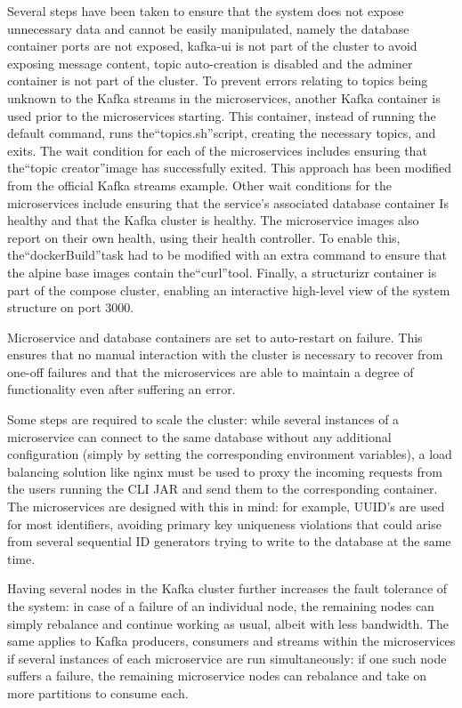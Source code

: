 \documentclass[parskip=full]{article}
\begin{document}
Several steps have been taken to ensure that the system does not expose unnecessary data and cannot be easily manipulated, namely the database container ports are not exposed, kafka-ui is not part of the cluster to avoid exposing message content, topic auto-creation is disabled and the adminer container is not part of the cluster.
To prevent errors relating to topics being unknown to the Kafka streams in the microservices, another Kafka container is used prior to the microservices starting.
This container, instead of running the default command, runs the``topics.sh''script, creating the necessary topics, and exits.
The wait condition for each of the microservices includes ensuring that the``topic creator''image has successfully exited.
This approach has been modified from the official Kafka streams example.
Other wait conditions for the microservices include ensuring that the service's associated database container Is healthy and that the Kafka cluster is healthy.
The microservice images also report on their own health, using their health controller.
To enable this, the``dockerBuild''task had to be modified with an extra command to ensure that the alpine base images contain the``curl''tool.
Finally, a structurizr container is part of the compose cluster, enabling an interactive high-level view of the system structure on port 3000.

Microservice and database containers are set to auto-restart on failure.
This ensures that no manual interaction with the cluster is necessary to recover from one-off failures and that the microservices are able to maintain a degree of functionality even after suffering an error.

Some steps are required to scale the cluster: while several instances of a microservice can connect to the same database without any additional configuration (simply by setting the corresponding environment variables), a load balancing solution like nginx must be used to proxy the incoming requests from the users running the CLI JAR and send them to the corresponding container.
The microservices are designed with this in mind: for example, UUID's are used for most identifiers, avoiding primary key uniqueness violations that could arise from several sequential ID generators trying to write to the database at the same time.

Having several nodes in the Kafka cluster further increases the fault tolerance of the system: in case of a failure of an individual node, the remaining nodes can simply rebalance and continue working as usual, albeit with less bandwidth.
The same applies to Kafka producers, consumers and streams within the microservices if several instances of each microservice are run simultaneously: if one such node suffers a failure, the remaining microservice nodes can rebalance and take on more partitions to consume each.
\end{document}
